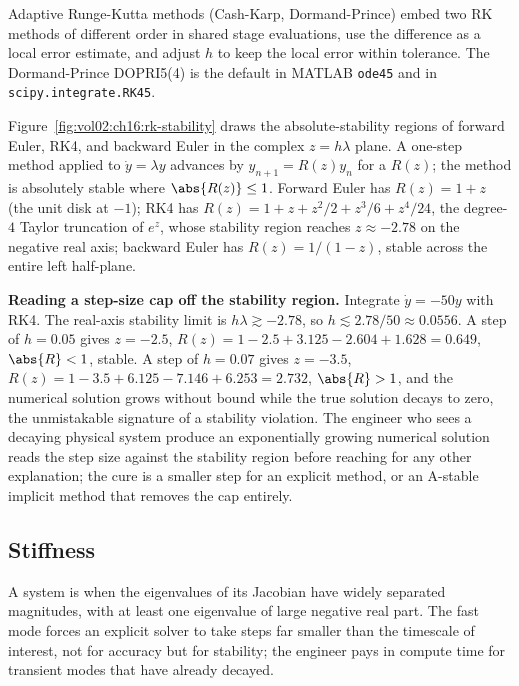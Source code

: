 Adaptive Runge-Kutta methods (Cash-Karp, Dormand-Prince) embed two
RK methods of different order in shared stage evaluations, use the
difference as a local error estimate, and adjust $h$ to keep the
local error within tolerance. The Dormand-Prince DOPRI5(4) is the
default in MATLAB \texttt{ode45} and in \texttt{scipy.integrate.RK45}.



Figure~\ref{fig:vol02:ch16:rk-stability} draws the absolute-stability
regions of forward Euler, RK4, and backward Euler in the complex
$z = h\lambda$ plane. A one-step method applied to $\dot y = \lambda
y$ advances by $y_{n+1} = R(z) y_{n}$ for a  $R(z)$; the method is absolutely stable where
$\abs{R(z)} \leq 1$. Forward Euler has $R(z) = 1 + z$ (the unit disk
at $-1$); RK4 has $R(z) = 1 + z + z^{2}/2 + z^{3}/6 + z^{4}/24$, the
degree-$4$ Taylor truncation of $e^{z}$, whose stability region
reaches $z \approx -2.78$ on the negative real axis; backward Euler
has $R(z) = 1/(1 - z)$, stable across the entire left half-plane.

\begin{example}
\textbf{Reading a step-size cap off the stability region.} Integrate
$\dot y = -50 y$ with RK4. The real-axis stability limit is
$h\lambda \gtrsim -2.78$, so $h \lesssim 2.78/50 \approx 0.0556$. A
step of $h = 0.05$ gives $z = -2.5$, $R(z) = 1 - 2.5 + 3.125 -
2.604 + 1.628 = 0.649$, $\abs{R} < 1$, stable. A step of $h = 0.07$
gives $z = -3.5$, $R(z) = 1 - 3.5 + 6.125 - 7.146 + 6.253 = 2.732$,
$\abs{R} > 1$, and the numerical solution grows without bound while
the true solution decays to zero, the unmistakable signature of a
stability violation. The engineer who sees a decaying physical
system produce an exponentially growing numerical solution reads the
step size against the stability region before reaching for any other
explanation; the cure is a smaller step for an explicit method, or
an A-stable implicit method that removes the cap entirely.
\end{example}

\subsection{Stiffness}

A system is  when the eigenvalues of its Jacobian
have widely separated magnitudes, with at least one eigenvalue of
large negative real part. The fast mode forces an explicit
solver to take steps far smaller than the timescale of interest,
not for accuracy but for stability; the engineer pays in compute
time for transient modes that have already decayed.

